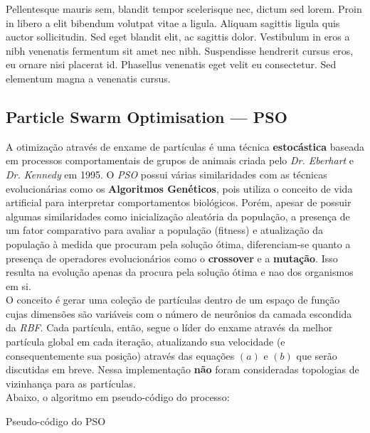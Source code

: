 \documentclass[10pt,twocolumn,letterpaper]{article}
\begin{document}
Pellentesque mauris sem, blandit tempor scelerisque nec, dictum sed lorem. Proin in libero a elit bibendum volutpat vitae a ligula. Aliquam sagittis ligula quis auctor sollicitudin. Sed eget blandit elit, ac sagittis dolor. Vestibulum in eros a nibh venenatis fermentum sit amet nec nibh. Suspendisse hendrerit cursus eros, eu ornare nisi placerat id. Phasellus venenatis eget velit eu consectetur. Sed elementum magna a venenatis cursus.

\subsection{Particle Swarm Optimisation --- PSO}
A otimização através de enxame de partículas é uma técnica \textbf{estocástica} baseada em processos comportamentais de grupos de animais criada pelo \textit{Dr. Eberhart} e  \textit{Dr. Kennedy} em 1995. O \textit{PSO} possui várias similaridades com as técnicas evolucionárias como os \textbf{Algoritmos Genéticos}, pois utiliza o conceito de vida artificial para interpretar comportamentos biológicos. Porém, apesar de possuir algumas similaridades como inicialização aleatória da população, a presença de um fator comparativo para avaliar a população (fitness) e atualização da população à medida que procuram pela solução ótima, diferenciam-se quanto a presença de operadores evolucionários como o \textbf{crossover} e a \textbf{mutação}. Isso resulta na evolução apenas da procura pela solução ótima e nao dos organismos em si.\\
O conceito é gerar uma coleção de partículas dentro de um espaço de função cujas dimensões são variáveis com o número de neurônios da camada escondida da \textit{RBF}. Cada partícula, então, segue o líder do enxame através da melhor partícula global em cada iteração, atualizando sua velocidade (e consequentemente sua posição) através das equações $(a)$ e $(b)$ que serão discutidas em breve. Nessa implementação \textbf{não} foram consideradas topologias de vizinhança para as partículas.~\cite{xiao}\\Abaixo, o algoritmo em pseudo-código do processo:

\begin{algorithm}[h!]
\caption{Pseudo-código do PSO}
\end{algorithm}
\end{document}
